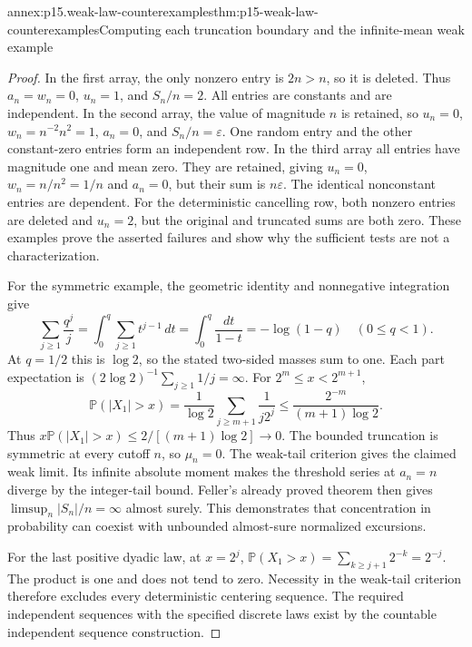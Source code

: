\begin{annexitem}{annex:p15.weak-law-counterexamples}{thm:p15-weak-law-counterexamples}{Computing each truncation boundary and the infinite-mean weak example}
\begin{proof}
In the first array, the only nonzero entry is \(2n>n\), so it
is deleted. Thus \(a_n=w_n=0\), \(u_n=1\), and \(S_n/n=2\).
All entries are constants and are independent. In the second array,
the value of magnitude \(n\) is retained, so \(u_n=0\),
\(w_n=n^{-2}n^2=1\), \(a_n=0\), and \(S_n/n=\varepsilon\).
One random entry and the other constant-zero entries form an independent
row. In the third array all entries have magnitude one and mean zero.
They are retained, giving \(u_n=0\), \(w_n=n/n^2=1/n\) and
\(a_n=0\), but their sum is \(n\varepsilon\).
The identical nonconstant entries are dependent.
For the deterministic cancelling row, both nonzero entries are
deleted and \(u_n=2\), but the original and truncated sums are both
zero. These examples prove the asserted failures and show why the
sufficient tests are not a characterization.

For the symmetric example, the geometric identity and nonnegative
integration give
\[
 \sum_{j\geq1}\frac{q^j}{j}
   =\int_0^q\sum_{j\geq1}t^{j-1}\,dt
   =\int_0^q\frac{dt}{1-t}=-\log(1-q)\quad(0\leq q<1).
\]
At \(q=1/2\) this is \(\log2\), so the stated two-sided
masses sum to one. Each part expectation is
\((2\log2)^{-1}\sum_{j\geq1}1/j=\infty\).
For \(2^m\leq x<2^{m+1}\),
\[
 \mathbb P(|X_1|>x)
   =\frac1{\log2}\sum_{j\geq m+1}\frac1{j2^j}
   \leq\frac{2^{-m}}{(m+1)\log2}.
\]
Thus \(x\mathbb P(|X_1|>x)\leq2/[(m+1)\log2]\to0\).
The bounded truncation is symmetric at every cutoff \(n\), so
\(\mu_n=0\). The weak-tail criterion gives the claimed weak limit.
Its infinite absolute moment makes the threshold series at \(a_n=n\)
diverge by the integer-tail bound. Feller's already proved theorem
then gives \(\limsup_n|S_n|/n=\infty\) almost surely.
This demonstrates that concentration in probability can coexist with
unbounded almost-sure normalized excursions.

For the last positive dyadic law, at \(x=2^j\),
\(\mathbb P(X_1>x)=\sum_{k\geq j+1}2^{-k}=2^{-j}\).
The product is one and does not tend to zero.
Necessity in the weak-tail criterion therefore excludes every
deterministic centering sequence. The required independent sequences
with the specified discrete laws exist by the countable independent
sequence construction.
\end{proof}
\end{annexitem}
